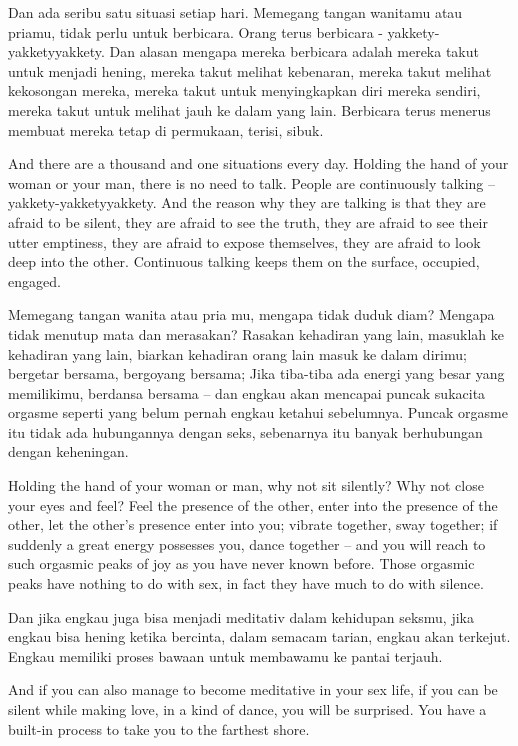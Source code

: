 \bahasa
Dan ada seribu satu situasi setiap hari. Memegang tangan wanitamu atau priamu, tidak perlu untuk berbicara. Orang terus berbicara - yakkety-yakketyyakkety. Dan alasan mengapa mereka berbicara adalah mereka takut untuk menjadi hening, mereka takut melihat kebenaran, mereka takut melihat kekosongan mereka, mereka takut untuk menyingkapkan diri mereka sendiri, mereka takut untuk melihat jauh ke dalam yang lain. Berbicara terus menerus membuat mereka tetap di permukaan, terisi, sibuk.

\english
And there are a thousand and one situations every day. Holding the hand of your woman or your man, there is no need to talk. People are continuously talking -- yakkety-yakketyyakkety. And the reason why they are talking is that they are afraid to be silent, they are afraid to see the truth, they are afraid to see their utter emptiness, they are afraid to expose themselves, they are afraid to look deep into the other. Continuous talking keeps them on the surface, occupied, engaged.

\bahasa
Memegang tangan wanita atau pria mu, mengapa tidak duduk diam? Mengapa tidak menutup mata dan merasakan? Rasakan kehadiran yang lain, masuklah ke kehadiran yang lain, biarkan kehadiran orang lain masuk ke dalam dirimu; bergetar bersama, bergoyang bersama; Jika tiba-tiba ada energi yang besar yang memilikimu, berdansa bersama -- dan engkau akan mencapai puncak sukacita orgasme seperti yang belum pernah engkau ketahui sebelumnya. Puncak orgasme itu tidak ada hubungannya dengan seks, sebenarnya itu banyak berhubungan dengan keheningan.

\english
Holding the hand of your woman or man, why not sit silently? Why not close your eyes and feel? Feel the presence of the other, enter into the presence of the other, let the other's presence enter into you; vibrate together, sway together; if suddenly a great energy possesses you, dance together -- and you will reach to such orgasmic peaks of joy as you have never known before. Those orgasmic peaks have nothing to do with sex, in fact they have much to do with silence.

\bahasa
Dan jika engkau juga bisa menjadi meditativ dalam kehidupan seksmu, jika engkau bisa hening ketika bercinta, dalam semacam tarian, engkau akan terkejut. Engkau memiliki proses bawaan untuk membawamu ke pantai terjauh.

\english
And if you can also manage to become meditative in your sex life, if you can be silent while making love, in a kind of dance, you will be surprised. You have a built-in process to take you to the farthest shore.

